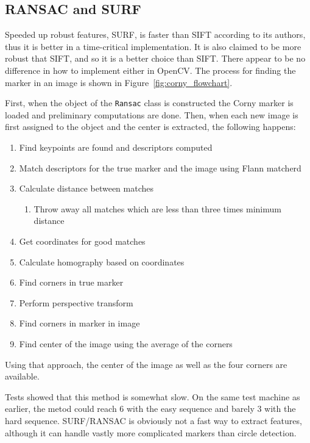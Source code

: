 \subsection{RANSAC and \textsc{SURF}}

Speeded up robust features, \textsc{SURF}, is faster than \textsc{SIFT} according to its authors\cite{WikiSURF}, thus it is better in a time-critical implementation.
It is also claimed to be more robust that \textsc{SIFT}, and so it is a better choice than SIFT.\@
There appear to be no difference in how to implement either in OpenCV.\@
The process for finding the marker in an image is shown in Figure~\vref{fig:corny_flowchart}.

First, when the object of the \verb|Ransac| class is constructed the Corny marker is loaded and preliminary computations are done.
Then, when each new image is first assigned to the object and the center is extracted, the following happens:
\begin{enumerate}
    \item Find keypoints are found and descriptors computed
    \item Match descriptors for the true marker and the image using Flann matcherd
    \item Calculate distance between matches
    \begin{enumerate}
    \item Throw away all matches which are less than three times minimum distance
    \end{enumerate}
    \item Get coordinates for good matches
    \item Calculate homography based on coordinates
    \item Find corners in true marker
    \item Perform perspective transform
    \item Find corners in marker in image
    \item Find center of the image using the average of the corners
\end{enumerate}

Using that approach, the center of the image as well as the four corners are available.

Tests showed that this method is somewhat slow. On the same test machine as earlier,
the metod could reach \SI{6}{\fps} with the easy sequence and barely \SI{3}{\fps} with the hard sequence.
SURF/RANSAC is obviously not a fast way to extract features, although it can handle vastly more complicated markers than circle detection.

